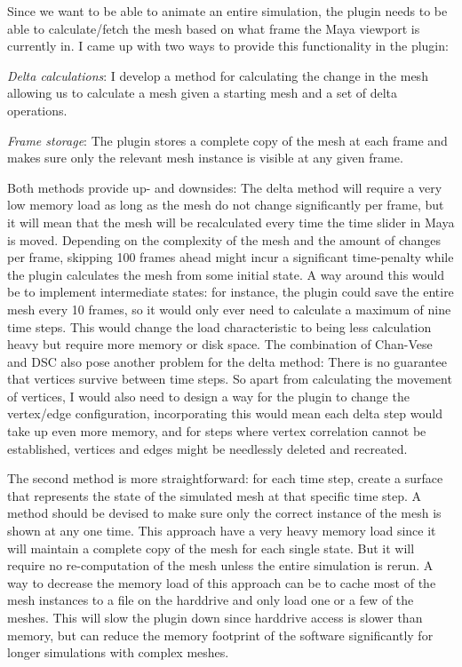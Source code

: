 Since we want to be able to animate an entire simulation, the plugin needs to
be able to calculate/fetch the mesh based on what frame the Maya viewport is
currently in. I came up with two ways to provide this functionality in the
plugin:
\begin{itemize*}
  \item \textit{Delta calculations}: I develop a method for calculating the
    change in the mesh allowing us to calculate a mesh given a starting mesh and
    a set of delta operations.
  \item \textit{Frame storage}: The plugin stores a complete copy of the mesh at
    each frame and makes sure only the relevant mesh instance is visible at any
    given frame.
\end{itemize*}
Both methods provide up- and downsides: The delta method will require a very
low memory load as long as the mesh do not change significantly per frame, but
it will mean that the mesh will be recalculated every time the time slider in
Maya is moved. Depending on the complexity of the mesh and the amount of
changes per frame, skipping 100 frames ahead might incur a significant
time-penalty while the plugin calculates the mesh from some initial state. A way
around this would be to implement intermediate states: for instance, the plugin
could save the entire mesh every 10 frames, so it would only ever need to
calculate a maximum of nine time steps. This would change the load characteristic
to being less calculation heavy but require more memory or disk space.
The combination of Chan-Vese and DSC also pose another problem for the delta
method: There is no guarantee that vertices survive between time steps. So apart
from calculating the movement of vertices, I would also need to design a way for
the plugin to change the vertex/edge configuration, incorporating this would
mean each delta step would take up even more memory, and for steps where vertex
correlation cannot be established, vertices and edges might be needlessly
deleted and recreated.

The second method is more straightforward: for each time step, create a
surface that represents the state of the simulated mesh at that specific time
step. A method should be devised to make sure only the correct instance of the
mesh is shown at any one time. This approach have a very heavy memory load since
it will maintain a complete copy of the mesh for each single state. But it will
require no re-computation of the mesh unless the entire simulation is rerun. A way
to decrease the memory load of this approach can be to cache most of the mesh
instances to a file on the harddrive and only load one or a few of the meshes.
This will slow the plugin down since harddrive access is slower than memory, but
can reduce the memory footprint of the software significantly for longer
simulations with complex meshes.

